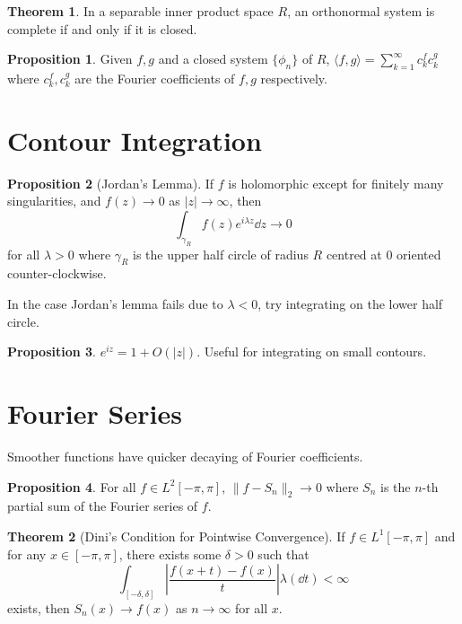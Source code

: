 \documentclass[]{article}
\theoremstyle{definition}
\newtheorem*{theorem}{Theorem}
\newtheorem*{proposition}{Proposition}
\begin{document}
\begin{theorem}
  In a separable inner product space \(R\), an orthonormal system is complete 
  if and only if it is closed.
\end{theorem}

\begin{proposition}
  Given \(f, g\) and a closed system \(\{\phi_n\}\) of \(R\), \(\langle f, g\rangle = 
  \sum_{k = 1}^\infty c_k^f c_k^g\) where \(c_k^f, c_k^g\) are the Fourier coefficients
  of \(f, g\) respectively.
\end{proposition}

\section*{Contour Integration}

\begin{proposition}[Jordan's Lemma]
  If \(f\) is holomorphic except for finitely many singularities, and \(f(z) \to 0\) 
  as \(|z| \to \infty\), then 
  \[\int_{\gamma_R} f(z)e^{i\lambda z}\dd z \to 0\]
  for all \(\lambda > 0\) where \(\gamma_R\) is the upper half circle of radius \(R\) 
  centred at 0 oriented counter-clockwise.
\end{proposition}

In the case Jordan's lemma fails due to \(\lambda < 0\), try integrating on the 
lower half circle.

\begin{proposition}
  \(e^{iz} = 1 + O(|z|)\). Useful for integrating on small contours.
\end{proposition}

\section*{Fourier Series}

Smoother functions have quicker decaying of Fourier coefficients.

\begin{proposition}
  For all \(f \in L^2[-\pi, \pi]\), \(\|f - S_n\|_2 \to 0\) where \(S_n\) is the 
  \(n\)-th partial sum of the Fourier series of \(f\).
\end{proposition}

\begin{theorem}[Dini's Condition for Pointwise Convergence]
  If \(f \in L^1[-\pi, \pi]\) and for any \(x \in [-\pi, \pi]\), there exists some 
  \(\delta > 0\) such that 
  \[\int_{[-\delta, \delta]} \left|\frac{f(x + t) - f(x)}{t}\right| \lambda(\dd t) < \infty\]
  exists, then \(S_n(x) \to f(x)\) as \(n \to \infty\) for all \(x\).
\end{theorem}
\end{document}
